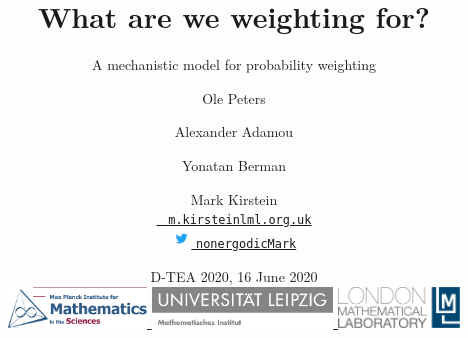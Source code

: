 \title[\insertlogo\\
\vspace{.5em}
\lmlblue{Mark Kirstein}]{\textbf{
What are we weighting for?
}}
\subtitle{A mechanistic model for probability weighting}


\author[M Kirstein]{
Ole Peters \and Alexander Adamou \and Yonatan Berman \and Mark Kirstein\\
\vspace{.5em}
{\small
\href{mailto:m.kirstein@lml.org.uk}{\Letter ~ \texttt{m.kirstein{\MVAt}lml.org.uk}} \\
	\href{https://twitter.com/nonergodicMark}{\includegraphics[height=1.4em,valign=c]
	{img/Twitter_Logo_Blue} \MVAt \texttt{nonergodicMark}}
}
}

\date[17 June 2020]{
D-TEA 2020, 16 June 2020\\
\vspace{.5cm}
\href{https://www.mis.mpg.de/jjost/research/economics.html}{
\includegraphics[height=1.1cm]{img/MPIMIS_en.png}
}
\hfill
\href{https://www.math.uni-leipzig.de/cms/de/forschung/abteilungen/wima/}{
\includegraphics[height=1.1cm]{img/Uni_Leipzig_MathemInstitut.jpg}
}
\hfill
\href{http://lml.org.uk}{
\includegraphics[height=1.1cm]{img/LML_LOGO_whiteBG.jpg}
}
}
